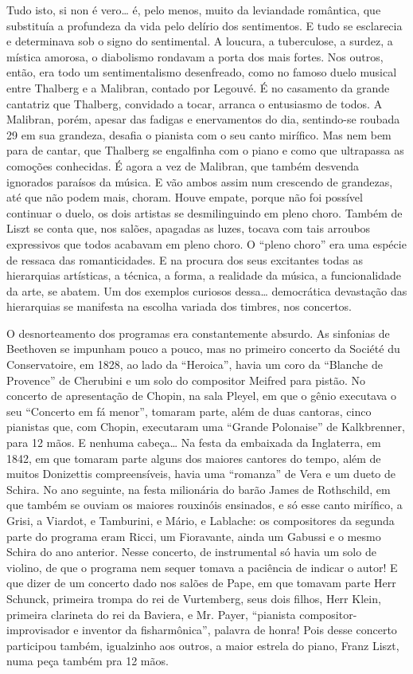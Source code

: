 Tudo isto, si non é vero\ldots{} é, pelo menos, muito da leviandade
romântica, que substituía a profundeza da vida pelo delírio dos
sentimentos. E tudo se esclarecia e determinava sob o signo do
sentimental. A loucura, a tuberculose, a surdez, a mística amorosa, o
diabolismo rondavam a porta dos mais fortes. Nos outros, então, era todo
um sentimentalismo desenfreado, como no famoso duelo musical entre
Thalberg e a Malibran, contado por Legouvé. É no casamento da grande
cantatriz que Thalberg, convidado a tocar, arranca o entusiasmo de
todos. A Malibran, porém, apesar das fadigas e enervamentos do dia,
sentindo-se roubada 29 em sua grandeza, desafia o pianista com o seu
canto mirífico. Mas nem bem para de cantar, que Thalberg se engalfinha
com o piano e como que ultrapassa as comoções conhecidas. É agora a vez
de Malibran, que também desvenda ignorados paraísos da música. E vão
ambos assim num crescendo de grandezas, até que não podem mais, choram.
Houve empate, porque não foi possível continuar o duelo, os dois
artistas se desmilinguindo em pleno choro. Também de Liszt se conta que,
nos salões, apagadas as luzes, tocava com tais arroubos expressivos que
todos acabavam em pleno choro. O ``pleno choro'' era uma espécie de
ressaca das romanticidades. E na procura dos seus excitantes todas as
hierarquias artísticas, a técnica, a forma, a realidade da música, a
funcionalidade da arte, se abatem. Um dos exemplos curiosos dessa\ldots{}
democrática devastação das hierarquias se manifesta na escolha variada
dos timbres, nos concertos.

O desnorteamento dos programas era constantemente absurdo. As sinfonias
de Beethoven se impunham pouco a pouco, mas no primeiro concerto da
Société du Conservatoire, em 1828, ao lado da ``Heroica'', havia um coro
da ``Blanche de Provence'' de Cherubini e um solo do compositor Meifred
para pistão. No concerto de apresentação de Chopin, na sala Pleyel, em
que o gênio executava o seu ``Concerto em fá menor'', tomaram parte,
além de duas cantoras, cinco pianistas que, com Chopin, executaram uma
``Grande Polonaise'' de Kalkbrenner, para 12 mãos. E nenhuma cabeça\ldots{}
Na festa da embaixada da Inglaterra, em 1842, em que tomaram parte
alguns dos maiores cantores do tempo, além de muitos Donizettis
compreensíveis, havia uma ``romanza'' de Vera e um dueto de Schira. No
ano seguinte, na festa milionária do barão James de Rothschild, em que
também se ouviam os maiores rouxinóis ensinados, e só esse canto
mirífico, a Grisi, a Viardot, e Tamburini, e Mário, e Lablache: os
compositores da segunda parte do programa eram Ricci, um Fioravante,
ainda um Gabussi e o mesmo Schira do ano anterior. Nesse concerto, de
instrumental só havia um solo de violino, de que o programa nem sequer
tomava a paciência de indicar o autor! E que dizer de um concerto dado
nos salões de Pape, em que tomavam parte Herr Schunck, primeira trompa
do rei de Vurtemberg, seus dois filhos, Herr Klein, primeira clarineta
do rei da Baviera, e Mr. Payer, ``pianista compositor-improvisador e
inventor da fisharmônica'', palavra de honra! Pois desse concerto
participou também, igualzinho aos outros, a maior estrela do piano,
Franz Liszt, numa peça também pra 12 mãos.

